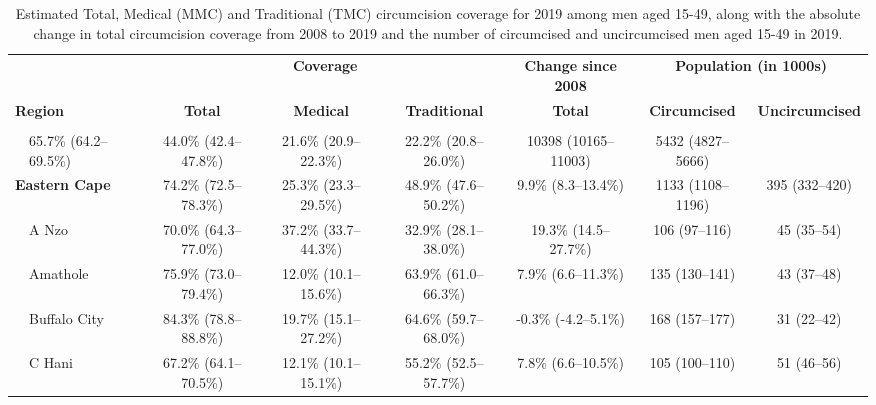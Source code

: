 \documentclass{article}
\begin{document}
\begin{landscape}

  {
  \linespread{1}
    \newpage
    \small
    \begin{longtable}[c]{llc cc ccc}
      \hline
      & & \multicolumn{3}{c}{\textbf{Coverage}} & \textbf{Change since 2008}& \multicolumn{2}{c}{\textbf{Population (in 1000s)}}  \\[1pt]
      \cmidrule(lr){3-5}
      \cmidrule(lr){6-6}
      \cmidrule(lr){7-8}
      \multicolumn{2}{l}{\textbf{Region}} & \textbf{Total}  & \textbf{Medical} & \textbf{Traditional} & \textbf{Total} &  \textbf{Circumcised} & \textbf{Uncircumcised} \\[3pt]
      \hline
      \vspace{-5pt}
      \endhead
      \\[-5pt]\hline
      \caption{Estimated Total, Medical (MMC) and Traditional (TMC) circumcision coverage for 2019 among men aged 15-49, along with the absolute change in total circumcision coverage from 2008 to 2019 and the number of circumcised and uncircumcised men aged 15-49 in 2019.}
      \endfoot
      \multicolumn{2}{l}{\textbf{South Africa}} & 65.7\% (64.2--69.5\%) & 44.0\% (42.4--47.8\%) & 21.6\% (20.9--22.3\%) & 22.2\% (20.8--26.0\%) & 10398 (10165--11003) & 5432 (4827--5666) \\[5pt]
      \multicolumn{2}{l}{\textbf{Eastern Cape}}  & 74.2\% (72.5--78.3\%) & 25.3\% (23.3--29.5\%) & 48.9\% (47.6--50.2\%) & 9.9\% (8.3--13.4\%) & 1133 (1108--1196) & 395 (332--420) \\
      & A Nzo & 70.0\% (64.3--77.0\%) & 37.2\% (33.7--44.3\%) & 32.9\% (28.1--38.0\%) & 19.3\% (14.5--27.7\%) & 106 (97--116) & 45 (35--54) \\
      & Amathole & 75.9\% (73.0--79.4\%) & 12.0\% (10.1--15.6\%) & 63.9\% (61.0--66.3\%) & 7.9\% (6.6--11.3\%) & 135 (130--141) & 43 (37--48) \\
      & Buffalo City & 84.3\% (78.8--88.8\%) & 19.7\% (15.1--27.2\%) & 64.6\% (59.7--68.0\%) & -0.3\% (-4.2--5.1\%) & 168 (157--177) & 31 (22--42) \\
      & C Hani & 67.2\% (64.1--70.5\%) & 12.1\% (10.1--15.1\%) & 55.2\% (52.5--57.7\%) & 7.8\% (6.6--10.5\%) & 105 (100--110) & 51 (46--56) \\

\end{longtable}}
\end{landscape}
\end{document}
